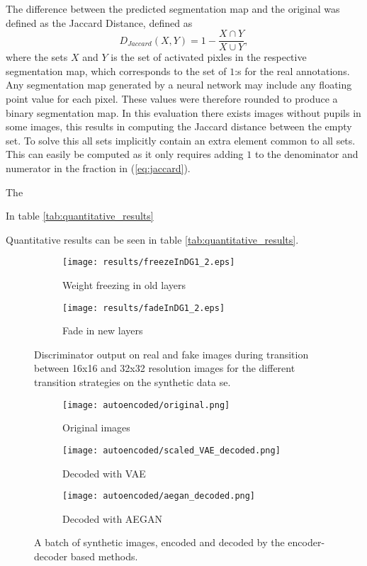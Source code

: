 The difference between the predicted segmentation map and the original was defined as the Jaccard Distance, defined as
\begin{equation}
    D_{Jaccard}(X, Y) = 1 - \frac{X \cap Y}{X \cup Y},
    \label{eq:jaccard}
\end{equation}
where the sets $X$ and $Y$ is the set of activated pixles in the respective segmentation map, which corresponds to the set of $1$:s for the real annotations. Any segmentation map generated by a neural network may include any floating point value for each pixel. These values were therefore rounded to produce a binary segmentation map. In this evaluation there exists images without pupils in some images, this results in computing the Jaccard distance between the empty set. To solve this all sets implicitly contain an extra element common to all sets. This can easily be computed as it only requires adding $1$ to the denominator and numerator in the fraction in (\ref{eq:jaccard}).

The 

In table \ref{tab:quantitative_results}

Quantitative results can be seen in table \ref{tab:quantitative_results}.

\begin{figure}[t]
    \centering
    \begin{subfigure}[b]{0.49\textwidth}
        \texttt{[image: results/freezeInDG1\_2.eps]}
        \caption{Weight freezing in old layers}
        \label{fig:freezeInDG1}
    \end{subfigure}
    \begin{subfigure}[b]{0.49\textwidth}
        \texttt{[image: results/fadeInDG1\_2.eps]}
        \caption{Fade in new layers}
        \label{fig:freezeInDG2}
    \end{subfigure}
    \caption{Discriminator output on real and fake images during transition between 16x16 and 32x32 resolution images for the different transition strategies on the synthetic data se.}
    \label{fig:fadeVsFreeze}
\end{figure}

\begin{figure}[t]
    \centering
    \begin{subfigure}[b]{\textwidth}
        \texttt{[image: autoencoded/original.png]}
        \caption{Original images}
        \label{fig:stuff}
    \end{subfigure}
    \begin{subfigure}[b]{\textwidth}
        \texttt{[image: autoencoded/scaled\_VAE\_decoded.png]}
        \caption{Decoded with VAE}
        \label{fig:stuff}
    \end{subfigure}
    \begin{subfigure}[b]{\textwidth}
        \texttt{[image: autoencoded/aegan\_decoded.png]}
        \caption{Decoded with AEGAN}
        \label{fig:stuff}
    \end{subfigure}
    \caption{A batch of synthetic images, encoded and decoded by the encoder-decoder based methods.}
    \label{fig:autoencoders}
\end{figure}

